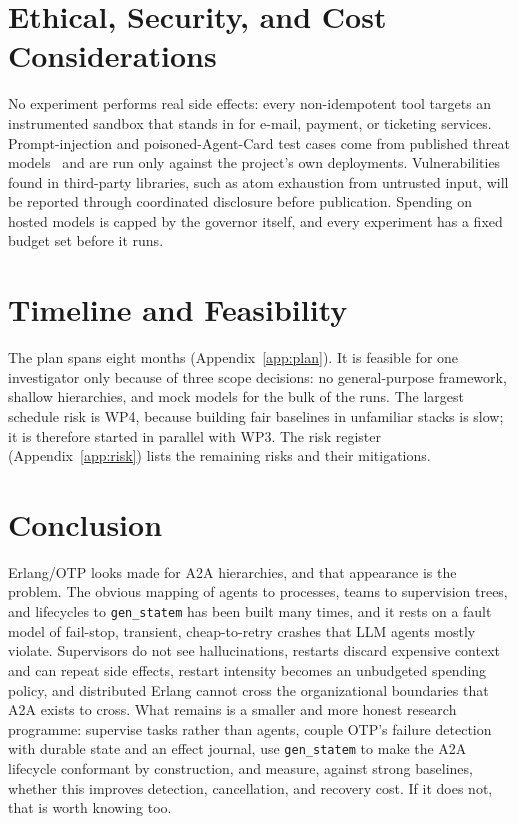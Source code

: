 \documentclass[conference,letterpaper]{IEEEtran}
\newcommand{\code}[1]{\texttt{#1}}
\newcommand{\gsm}{\code{gen\_statem}}
\begin{document}
\section{Ethical, Security, and Cost Considerations}

No experiment performs real side effects: every non-idempotent tool targets
an instrumented sandbox that stands in for e-mail, payment, or ticketing
services. Prompt-injection and poisoned-Agent-Card test cases come from
published threat models~\cite{habler2025,aaif2026} and are run only against
the project's own deployments. Vulnerabilities found in third-party
libraries, such as atom exhaustion from untrusted input, will be reported
through coordinated disclosure before publication. Spending on hosted models
is capped by the governor itself, and every experiment has a fixed budget
set before it runs.

\section{Timeline and Feasibility}

The plan spans eight months (Appendix~\ref{app:plan}). It is feasible for
one investigator only because of three scope decisions: no general-purpose
framework, shallow hierarchies, and mock models for the bulk of the runs.
The largest schedule risk is WP4, because building fair baselines in
unfamiliar stacks is slow; it is therefore started in parallel with WP3. The
risk register (Appendix~\ref{app:risk}) lists the remaining risks and their
mitigations.

\section{Conclusion}

Erlang/OTP looks made for A2A hierarchies, and that appearance is the
problem. The obvious mapping of agents to processes, teams to supervision
trees, and lifecycles to \gsm{} has been built many times, and it rests on
a fault model of fail-stop, transient, cheap-to-retry crashes that LLM
agents mostly violate. Supervisors do not see hallucinations, restarts
discard expensive context and can repeat side effects, restart intensity
becomes an unbudgeted spending policy, and distributed Erlang cannot cross
the organizational boundaries that A2A exists to cross. What remains is a
smaller and more honest research programme: supervise tasks rather than
agents, couple OTP's failure detection with durable state and an effect
journal, use \gsm{} to make the A2A lifecycle conformant by construction,
and measure, against strong baselines, whether this improves detection,
cancellation, and recovery cost. If it does not, that is worth knowing too.
\end{document}
